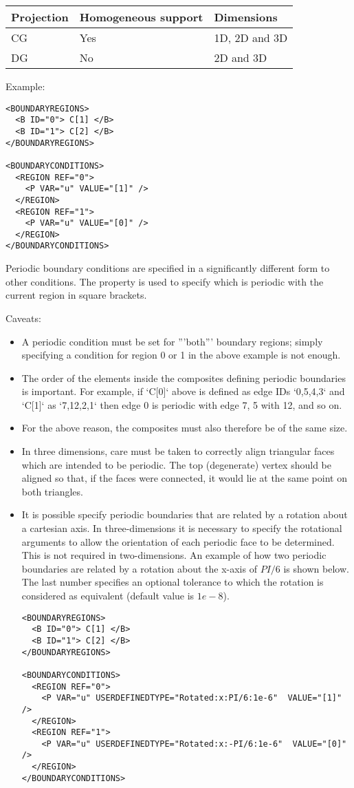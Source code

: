 \begin{tabular}{lll}
Projection & Homogeneous support & Dimensions \\
\toprule
CG  & Yes & 1D, 2D and 3D \\
DG  & No  & 2D and 3D
\end{tabular}

Example:
\begin{lstlisting}[style=XMLStyle]
<BOUNDARYREGIONS>
  <B ID="0"> C[1] </B>
  <B ID="1"> C[2] </B>
</BOUNDARYREGIONS>

<BOUNDARYCONDITIONS>
  <REGION REF="0">
    <P VAR="u" VALUE="[1]" />
  </REGION>
  <REGION REF="1">
    <P VAR="u" VALUE="[0]" />
  </REGION>
</BOUNDARYCONDITIONS>
\end{lstlisting}

Periodic boundary conditions are specified in a significantly different form to
other conditions. The  property is used to specify which
 is periodic with the current region in square brackets.

Caveats:
\begin{itemize}
\item A periodic condition must be set for '''both''' boundary regions; simply
 specifying a condition for region 0 or 1 in the above example is not enough.
\item The order of the elements inside the composites defining periodic
boundaries is important. For example, if `C[0]` above is defined as edge IDs 
`{0,5,4,3}` and `C[1]` as `{7,12,2,1}` then edge 0 is periodic with edge 7, 5 
with 12, and so on.
\item For the above reason, the composites must also therefore be of the same
size.
\item In three dimensions, care must be taken to correctly align triangular
faces which are intended to be periodic. The top (degenerate) vertex should be 
aligned so that, if the faces were connected, it would lie at the same point on 
both triangles.

\item It is possible specify periodic boundaries that are related by a
  rotation about a cartesian axis. In three-dimensions it is necessary
  to specify the rotational arguments to allow the orientation of each
  periodic face to be determined. This is not required in
  two-dimensions. An example of how two periodic boundaries are
  related by a rotation about the x-axis of $PI/6$ is shown below. The
  last number specifies an optional tolerance to which the rotation is
  considered as equivalent (default value is $1e-8$).
  
  \begin{lstlisting}[style=XMLStyle]
<BOUNDARYREGIONS>
  <B ID="0"> C[1] </B>
  <B ID="1"> C[2] </B>
</BOUNDARYREGIONS>

<BOUNDARYCONDITIONS>
  <REGION REF="0">
    <P VAR="u" USERDEFINEDTYPE="Rotated:x:PI/6:1e-6"  VALUE="[1]" />
  </REGION>
  <REGION REF="1">
    <P VAR="u" USERDEFINEDTYPE="Rotated:x:-PI/6:1e-6"  VALUE="[0]" />
  </REGION>
</BOUNDARYCONDITIONS>
\end{lstlisting}


\end{itemize}

